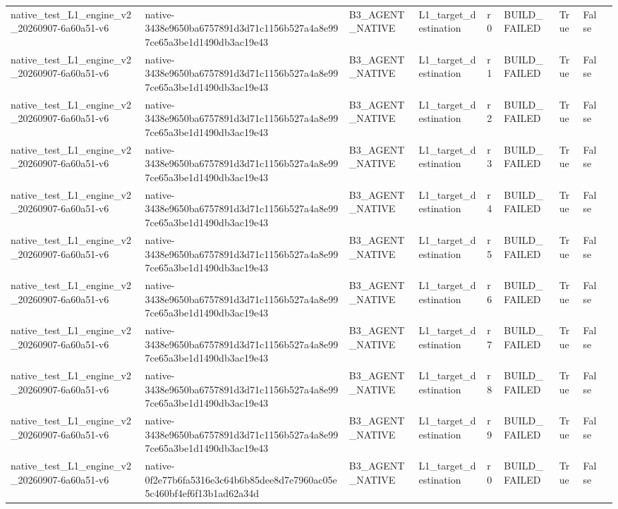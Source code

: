 \begin{tabular}{lllllllll}
native\_test\_L1\_engine\_v2\_20260907-6a60a51-v6 & native-3438e9650ba6757891d3d71c1156b527a4a8e997ce65a3be1d1490db3ac19e43 & B3\_AGENT\_NATIVE & L1\_target\_destination & r0 & BUILD\_FAILED & True & False &  \\
native\_test\_L1\_engine\_v2\_20260907-6a60a51-v6 & native-3438e9650ba6757891d3d71c1156b527a4a8e997ce65a3be1d1490db3ac19e43 & B3\_AGENT\_NATIVE & L1\_target\_destination & r1 & BUILD\_FAILED & True & False &  \\
native\_test\_L1\_engine\_v2\_20260907-6a60a51-v6 & native-3438e9650ba6757891d3d71c1156b527a4a8e997ce65a3be1d1490db3ac19e43 & B3\_AGENT\_NATIVE & L1\_target\_destination & r2 & BUILD\_FAILED & True & False &  \\
native\_test\_L1\_engine\_v2\_20260907-6a60a51-v6 & native-3438e9650ba6757891d3d71c1156b527a4a8e997ce65a3be1d1490db3ac19e43 & B3\_AGENT\_NATIVE & L1\_target\_destination & r3 & BUILD\_FAILED & True & False &  \\
native\_test\_L1\_engine\_v2\_20260907-6a60a51-v6 & native-3438e9650ba6757891d3d71c1156b527a4a8e997ce65a3be1d1490db3ac19e43 & B3\_AGENT\_NATIVE & L1\_target\_destination & r4 & BUILD\_FAILED & True & False &  \\
native\_test\_L1\_engine\_v2\_20260907-6a60a51-v6 & native-3438e9650ba6757891d3d71c1156b527a4a8e997ce65a3be1d1490db3ac19e43 & B3\_AGENT\_NATIVE & L1\_target\_destination & r5 & BUILD\_FAILED & True & False &  \\
native\_test\_L1\_engine\_v2\_20260907-6a60a51-v6 & native-3438e9650ba6757891d3d71c1156b527a4a8e997ce65a3be1d1490db3ac19e43 & B3\_AGENT\_NATIVE & L1\_target\_destination & r6 & BUILD\_FAILED & True & False &  \\
native\_test\_L1\_engine\_v2\_20260907-6a60a51-v6 & native-3438e9650ba6757891d3d71c1156b527a4a8e997ce65a3be1d1490db3ac19e43 & B3\_AGENT\_NATIVE & L1\_target\_destination & r7 & BUILD\_FAILED & True & False &  \\
native\_test\_L1\_engine\_v2\_20260907-6a60a51-v6 & native-3438e9650ba6757891d3d71c1156b527a4a8e997ce65a3be1d1490db3ac19e43 & B3\_AGENT\_NATIVE & L1\_target\_destination & r8 & BUILD\_FAILED & True & False &  \\
native\_test\_L1\_engine\_v2\_20260907-6a60a51-v6 & native-3438e9650ba6757891d3d71c1156b527a4a8e997ce65a3be1d1490db3ac19e43 & B3\_AGENT\_NATIVE & L1\_target\_destination & r9 & BUILD\_FAILED & True & False &  \\
native\_test\_L1\_engine\_v2\_20260907-6a60a51-v6 & native-0f2e77b6fa5316e3c64b6b85dee8d7e7960ac05e5c460bf4ef6f13b1ad62a34d & B3\_AGENT\_NATIVE & L1\_target\_destination & r0 & BUILD\_FAILED & True & False &  \\

\end{tabular}
